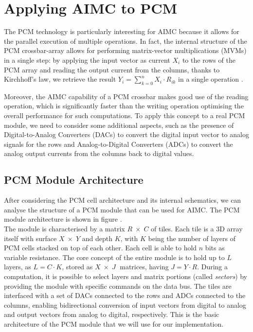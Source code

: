 \section{Applying AIMC to PCM}\label{sec:aimc_pcm}
The PCM technology is particularly interesting for AIMC because it allows for the parallel execution of multiple operations.
In fact, the internal structure of the PCM crossbar-array  allows for performing matrix-vector multiplications (MVMs) in a single step: by applying the input vector as current $X_i$ to the rows of the PCM array and reading the output current from the columns, thanks to Kirchhoff's law, we retrieve the result $Y_i = \sum_{k=0}^{n} X_i \cdot R_{ik}$ in a single operation \cite{he_-memory_2023}.

Moreover, the AIMC capability of a PCM crossbar makes good use of the reading operation, which is significantly faster than the writing operation optimising the overall performance for such computations.
To apply this concept to a real PCM module, we need to consider some additional aspects, such as the presence of Digital-to-Analog Converters (DACs) to convert the digital input vector to analog signals for the rows and Analog-to-Digital Converters (ADCs) to convert the analog output currents from the columns back to digital values.

\subsection{PCM Module Architecture}\label{sec:PCM_Module_arch}
After considering the PCM cell architecture and its internal schematics, we can analyse the structure of a PCM module that can be used for AIMC.
The PCM module architecture is shown in figure .\\
The module is characterised by a matrix $R\;\times\;C$ of tiles. Each tile is a 3D array itself with surface $X \;\times\; Y$ and depth $K$, with $K$ being the 
number of layers of PCM cells stacked on top of each other. Each cell is able to hold $n$ bits as variable resistance. 
The core concept of the entire module is to hold up to $L$ layers, as $L = C \cdot K$, stored as $X\;\times\;J\;$ matrices, having $J=Y\cdot R$.
During a computation, it is possible to select layers and matrix portions (called \emph{sectors}) by providing the module with specific commands on the data bus.
The tiles are interfaced with a set of DACs connected to the rows and ADCs connected to the columns, enabling bidirectional conversion of input vectors from digital to analog and output vectors from analog to digital, respectively.
This is the basic architecture of the PCM module that we will use for our implementation.

